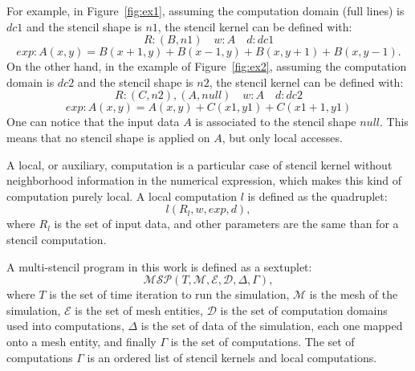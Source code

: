 For example, in Figure~\ref{fig:ex1}, assuming the computation domain (full lines) is $dc1$ and the stencil shape is $n1$, the stencil kernel can be defined with:
\begin{equation*}
R: {(B,n1)} \quad w: A \quad d: dc1
\end{equation*}
\begin{equation*}
exp: A(x,y)=B(x+1,y)+B(x-1,y)+B(x,y+1)+B(x,y-1).
\end{equation*}
On the other hand, in the example of Figure~\ref{fig:ex2}, assuming the computation domain is $dc2$ and the stencil shape is $n2$, the stencil kernel can be defined with:
\begin{equation*}
R: {(C,n2),(A,null)} \quad w: A \quad d: dc2
\end{equation*}
\begin{equation*}
exp: A(x,y)=A(x,y)+C(x1,y1)+C(x1+1,y1)
\end{equation*}
One can notice that the input data $A$ is associated to the stencil shape $null$. This means that no stencil shape is applied on $A$, but only local accesses.

A local, or auxiliary, computation is a particular case of stencil kernel without neighborhood information in the numerical expression, which makes this kind of computation purely local. A local computation $l$ is defined as the quadruplet:
\begin{equation} 
l(R_l,w,exp,d),
\label{eq:loc}
\end{equation}
where $R_l$ is the set of input data, and other parameters are the same than for a stencil computation.

A multi-stencil program in this work is defined as a sextuplet:
\begin{equation} 
\mathcal{MSP}(T,\mathcal{M},\mathcal{E},\mathcal{D},\Delta,\Gamma),
\label{eq:msp}
\end{equation}
where $T$ is the set of time iteration to run the simulation, $\mathcal{M}$ is the mesh of the simulation, $\mathcal{E}$ is the set of mesh entities, $\mathcal{D}$ is the set of computation domains used into computations, $\Delta$ is the set of data of the simulation, each one mapped onto a mesh entity, and finally $\Gamma$ is the set of computations. The set of computations $\Gamma$ is an ordered list of stencil kernels and local computations. 


